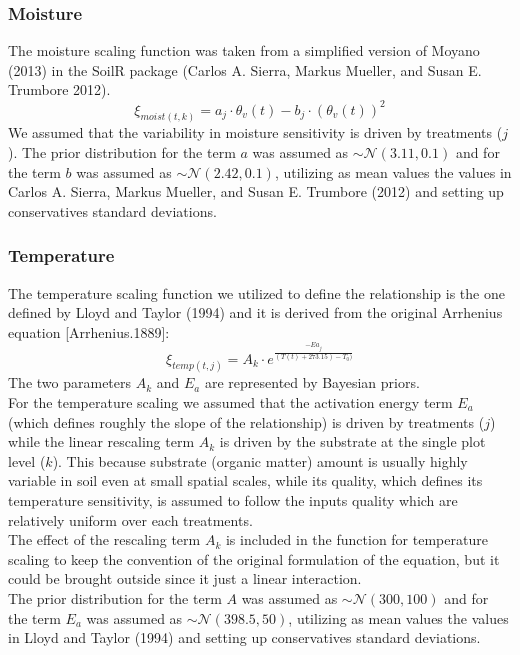 \documentclass[
]{article}
\begin{document}
\subsubsection{Moisture}\label{moisture}

The moisture scaling function was taken from a simplified version of Moyano (2013) in the SoilR package (Carlos A. Sierra, Markus Mueller, and Susan E. Trumbore 2012).
\[
\xi_{moist(t,k)} = a_j \cdot \theta_{v}(t) - b_j \cdot (\theta_{v}(t))^2
\]
We assumed that the variability in moisture sensitivity is driven by treatments (\(j\)).
The prior distribution for the term \(a\) was assumed as \(\sim \mathcal{N}(3.11, 0.1)\) and for the term \(b\) was assumed as \(\sim \mathcal{N}(2.42, 0.1)\), utilizing as mean values the values in Carlos A. Sierra, Markus Mueller, and Susan E. Trumbore (2012) and setting up conservatives standard deviations.

\subsubsection{Temperature}\label{temperature}

The temperature scaling function we utilized to define the relationship is the one defined by Lloyd and Taylor (1994) and it is derived from the original Arrhenius equation {[}Arrhenius.1889{]}:
\[
\xi_{temp(t,j)} = A_{k} \cdot e^{\frac{-Ea_j}{(T(t)+273.15)-T_0)}}
\]
The two parameters \(A_{k}\) and \(E_a\) are represented by Bayesian priors.\\
For the temperature scaling we assumed that the activation energy term \(E_a\) (which defines roughly the slope of the relationship) is driven by treatments (\(j\)) while the linear rescaling term \(A_{k}\) is driven by the substrate at the single plot level (\(k\)). This because substrate (organic matter) amount is usually highly variable in soil even at small spatial scales, while its quality, which defines its temperature sensitivity, is assumed to follow the inputs quality which are relatively uniform over each treatments.\\
The effect of the rescaling term \(A_{k}\) is included in the function for temperature scaling to keep the convention of the original formulation of the equation, but it could be brought outside since it just a linear interaction.\\
The prior distribution for the term \(A\) was assumed as \(\sim \mathcal{N}(300, 100)\) and for the term \(E_a\) was assumed as \(\sim \mathcal{N}(398.5, 50)\), utilizing as mean values the values in Lloyd and Taylor (1994) and setting up conservatives standard deviations.
\end{document}
